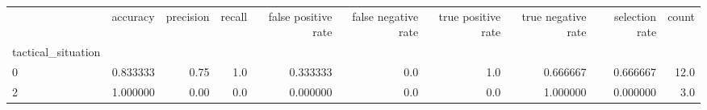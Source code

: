\begin{tabular}{lrrrrrrrrr}
\toprule
{} &  accuracy &  precision &  recall &  false positive rate &  false negative rate &  true positive rate &  true negative rate &  selection rate &  count \\
tactical\_situation &           &            &         &                      &                      &                     &                     &                 &        \\
\midrule
0                  &  0.833333 &       0.75 &     1.0 &             0.333333 &                  0.0 &                 1.0 &            0.666667 &        0.666667 &   12.0 \\
2                  &  1.000000 &       0.00 &     0.0 &             0.000000 &                  0.0 &                 0.0 &            1.000000 &        0.000000 &    3.0 \\
\bottomrule
\end{tabular}
